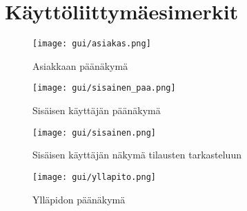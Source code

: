 \chapter{Käyttöliittymäesimerkit}
\label{kayttoliittyma}

\begin{figure}
    \texttt{[image: gui/asiakas.png]}
    \caption{Asiakkaan päänäkymä}
    \label{img:asiakas}
\end{figure}

\begin{figure}
    \texttt{[image: gui/sisainen\_paa.png]}
    \caption{Sisäisen käyttäjän päänäkymä}
    \label{img:sisainenpaa}
\end{figure}

\begin{figure}
    \texttt{[image: gui/sisainen.png]}
    \caption{Sisäisen käyttäjän näkymä tilausten tarkasteluun}
    \label{img:sisainen}
\end{figure}

\begin{figure}
    \texttt{[image: gui/yllapito.png]}
    \caption{Ylläpidon päänäkymä}
    \label{img:yllapito}
\end{figure}
